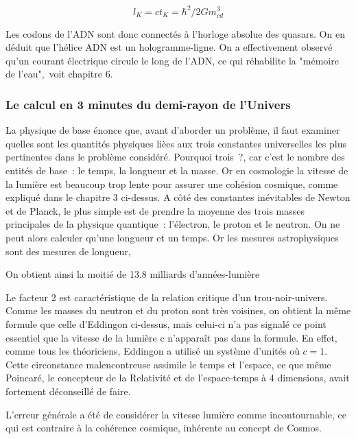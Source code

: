\documentclass[a4paper,12pt]{article}
\begin{document}
\begin{equation}
l_K = ct_K  = \hbar^2/2Gm_{cd}^3 
\end{equation}      
     
Les codons de l'ADN sont donc connectés à l'horloge absolue des quasars. On en déduit que l'hélice ADN est un hologramme-ligne. On a effectivement observé qu'un courant électrique circule le long de l'ADN, ce qui réhabilite la "mémoire de l'eau", voit chapitre 6.




\subsubsection{Le calcul en 3 minutes du demi-rayon de l’Univers}

La physique de base énonce que, avant d’aborder un problème, il faut examiner quelles sont les quantités physiques lièes aux trois constantes universelles les plus pertinentes dans le problème considéré. Pourquoi trois ?, car c’est le nombre des entités de base : le  temps, la longueur et la masse. Or en cosmologie la vitesse de la lumière est beaucoup trop lente pour assurer une cohésion cosmique, comme expliqué dans le chapitre 3 ci-dessus. A côté des constantes inévitables de Newton et de Planck, le plus simple est de prendre la moyenne des trois masses principales de la physique quantique : l'électron, le proton et le neutron. On ne peut alors calculer qu’une longueur et un temps. Or les mesures astrophysiques sont des mesures de longueur, 


On obtient ainsi la moitié de 13.8 milliards d'années-lumière 


Le facteur 2 est caractéristique de la relation critique d’un trou-noir-univers. Comme les masses du neutron et du proton sont très voisines, on obtient la même formule que celle d’Eddingon ci-dessus, mais celui-ci n’a pas signalé ce point essentiel que la vitesse de la lumière c n’apparaît pas dans la formule. En effet, comme tous les théoriciens, Eddingon a utilisé un système d’unités où $c = 1$. Cette circonstance malencontreuse assimile le temps et l’espace, ce que même Poincaré, le concepteur de la Relativité et de l’espace-temps à 4 dimensions, avait fortement déconseillé de faire.


L’erreur générale a été de considérer la vitesse lumière comme incontournable, ce qui est contraire à la cohérence cosmique, inhérente au concept de Cosmos.

 
 
 
 
\end{document}
